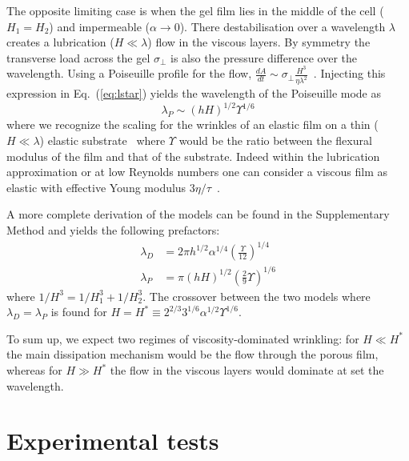 \documentclass[twocolumn,superscriptaddress,showpacs,preprintnumbers,
amsmath,amssymb,prl]{revtex4-1}
\begin{document}
The opposite limiting case is when the gel film lies in the middle of the cell ($H_1=H_2$) and impermeable ($\alpha\rightarrow 0$). There destabilisation over a wavelength $\lambda$ creates a lubrication ($H\ll\lambda$) flow in the viscous layers. By symmetry the transverse load across the gel $\sigma_\perp$ is also the pressure difference over the wavelength. Using a Poiseuille profile for the flow, $\frac{dA}{dt} \sim \sigma_\perp \frac{H^3}{\eta\lambda^2}$~\cite{Poiseuille1842}. Injecting this expression in Eq.~(\ref{eq:lstar}) yields the wavelength of the Poiseuille mode as
\begin{equation}
\lambda_P \sim (hH)^{1/2} \Upsilon^{1/6}
\end{equation}
where we recognize the scaling for the wrinkles of an elastic film on a thin ($H\ll\lambda$) elastic substrate~\cite{Cerda2003} where $\Upsilon$ would be the ratio between the flexural modulus of the film and that of the substrate. Indeed within the lubrication approximation or at low Reynolds numbers one can consider a viscous film as elastic with effective Young modulus $3\eta/\tau$~\cite{Biot1957,Boudaoud2001}.

A more complete derivation of the models can be found in the Supplementary Method and yields the following prefactors:
\begin{align}
\lambda_D &= 2\pi h^{1/2}\alpha^{1/4}\left(\frac{\Upsilon}{12}\right)^{1/4}\\
\lambda_P &= \pi (hH)^{1/2}\left(\frac{2}{9}\Upsilon\right)^{1/6}
\end{align}
where $1/H^3 = 1/H_1^3 + 1/H_2^3$. The crossover between the two models where $\lambda_D=\lambda_P$ is found for $H = H^* \equiv 2^{2/3} 3^{1/6} \alpha^{1/2} \Upsilon^{1/6}$.

To sum up, we expect two regimes of viscosity-dominated wrinkling: for $H\ll H^*$ the main dissipation mechanism would be the flow through the porous film, whereas for $H\gg H^*$ the flow in the viscous layers would dominate at set the wavelength.

\section*{Experimental tests}
\end{document}
